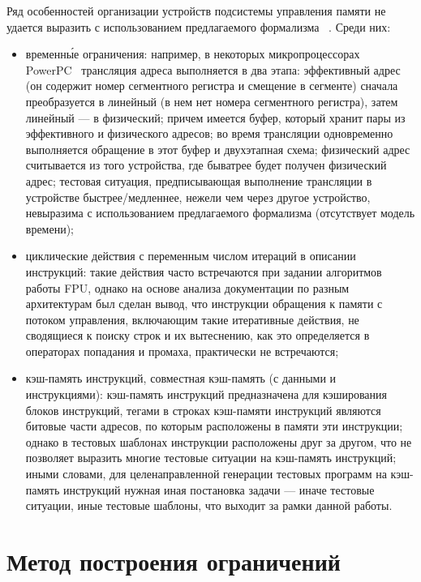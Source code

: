 Ряд особенностей организации устройств подсистемы управления памяти не удается выразить с использованием предлагаемого формализма ~\cite{my_ewdts_2009}. Среди них:
\begin{itemize}
    \item временн\'{ы}е ограничения: например, в некоторых микропроцессорах\\ PowerPC~\cite{PowerPC} трансляция адреса выполняется в два этапа: эффективный адрес (он содержит номер сегментного регистра и смещение в сегменте) сначала преобразуется в линейный (в нем нет номера сегментного регистра), затем линейный --- в физический; причем имеется буфер, который хранит пары из эффективного и физического адресов; во время трансляции одновременно выполняется обращение в этот буфер и двухэтапная схема; физический адрес считывается из того устройства, где быватрее будет получен физический адрес; тестовая ситуация, предписывающая выполнение трансляции в устройстве быстрее/медленнее, нежели чем через другое устройство, невыразима с использованием предлагаемого формализма (отсутствует модель времени);
    \item циклические действия с переменным числом итераций в описании инструкций: такие действия часто встречаются при задании алгоритмов работы FPU, однако на основе анализа документации по разным архитектурам был сделан вывод, что инструкции обращения к памяти с потоком управления, включающим такие итеративные действия, не сводящиеся к поиску строк и их вытеснению, как это определяется в операторах попадания и промаха, практически не встречаются;
    \item кэш-память инструкций, совместная кэш-память (с данными и инструкциями): кэш-память инструкций предназначена для кэширования блоков инструкций, тегами в строках кэш-памяти инструкций являются битовые части адресов, по которым расположены в памяти эти инструкции; однако в тестовых шаблонах инструкции расположены друг за другом, что не позволяет выразить многие тестовые ситуации на кэш-память инструкций; иными словами, для целенаправленной генерации тестовых программ на кэш-память инструкций нужная иная постановка задачи --- иначе тестовые ситуации, иные тестовые шаблоны, что выходит за рамки данной работы.
\end{itemize}

\section{Метод построения ограничений}\label{sec:constraints_generation_section}

